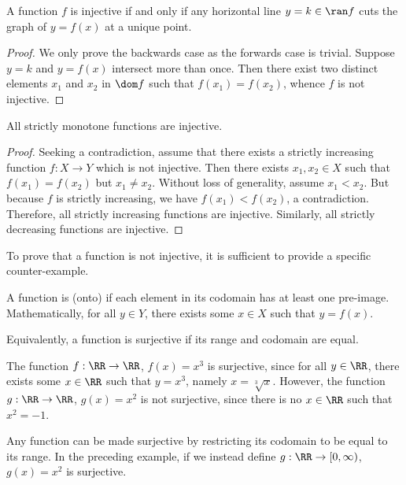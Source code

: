 \begin{proposition}
    A function $f$ is injective if and only if any horizontal line $y = k \in \ran f$ cuts the graph of $y = f(x)$ at a unique point.
\end{proposition}
\begin{proof}
    We only prove the backwards case as the forwards case is trivial. Suppose $y = k$ and $y = f(x)$ intersect more than once. Then there exist two distinct elements $x_1$ and $x_2$ in $\dom f$ such that $f(x_1) = f(x_2)$, whence $f$ is not injective.
\end{proof}

\begin{proposition}
    All strictly monotone functions are injective.
\end{proposition}
\begin{proof}
    Seeking a contradiction, assume that there exists a strictly increasing function $f : X \to Y$ which is not injective. Then there exists $x_1, x_2 \in X$ such that $f(x_1) = f(x_2)$ but $x_1 \neq x_2$. Without loss of generality, assume $x_1 < x_2$. But because $f$ is strictly increasing, we have $f(x_1) < f(x_2)$, a contradiction. Therefore, all strictly increasing functions are injective. Similarly, all strictly decreasing functions are injective.
\end{proof}

To prove that a function is not injective, it is sufficient to provide a specific counter-example.

\begin{definition}
    A function is  (onto) if each element in its codomain has at least one pre-image. Mathematically, for all $y \in Y$, there exists some $x \in X$ such that $y = f(x)$.
\end{definition}

Equivalently, a function is surjective if its range and codomain are equal.

\begin{example}
    The function $f : \RR \to \RR$, $f(x) = x^3$ is surjective, since for all $y \in \RR$, there exists some $x \in \RR$ such that $y = x^3$, namely $x = \sqrt[3]{x}$. However, the function $g : \RR \to \RR$, $g(x) = x^2$ is not surjective, since there is no $x \in \RR$ such that $x^2 = -1$.
\end{example}

Any function can be made surjective by restricting its codomain to be equal to its range. In the preceding example, if we instead define $g : \RR \to [0, \infty)$, $g(x) = x^2$ is surjective.

